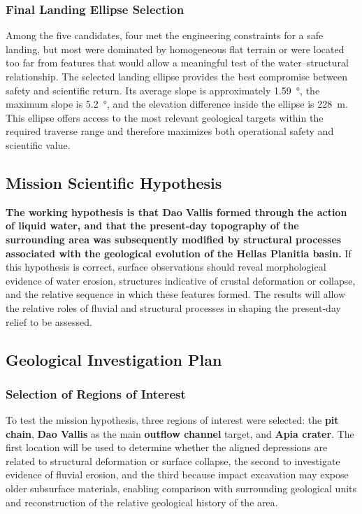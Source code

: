 \subsubsection{Final Landing Ellipse Selection}
\label{sec:final_landing_ellipse}
Among the five candidates, four met the engineering constraints for a safe landing, but most were dominated by homogeneous flat terrain or were located too far from features that would allow a meaningful test of the water--structural relationship.
The selected landing ellipse provides the best compromise between safety and scientific return. Its average slope is approximately \qty{1.59}{\degree}, the maximum slope is \qty{5.2}{\degree}, and the elevation difference inside the ellipse is \qty{228}{\meter}. This ellipse offers access to the most relevant geological targets within the required traverse range and therefore maximizes both operational safety and scientific value.

\subsection{Mission Scientific Hypothesis}
\label{sec:scientific_hypothesis}
\textcolor{ercblue}{\textbf{The working hypothesis is that Dao Vallis formed through the action of liquid water, and that the present-day topography of the surrounding area was subsequently modified by structural processes associated with the geological evolution of the Hellas Planitia basin.}}
If this hypothesis is correct, surface observations should reveal morphological evidence of water erosion, structures indicative of crustal deformation or collapse, and the relative sequence in which these features formed. The results will allow the relative roles of fluvial and structural processes in shaping the present-day relief to be assessed.

\subsection{Geological Investigation Plan}
\label{sec:investigation_plan}

\subsubsection{Selection of Regions of Interest}
\label{sec:roi_selection}
To test the mission hypothesis, three regions of interest were selected: the \textbf{pit chain}, \textbf{Dao Vallis} as the main \textbf{outflow channel} target, and \textbf{Apia crater}. The first location will be used to determine whether the aligned depressions are related to structural deformation or surface collapse, the second to investigate evidence of fluvial erosion, and the third because impact excavation may expose older subsurface materials, enabling comparison with surrounding geological units and reconstruction of the relative geological history of the area.

